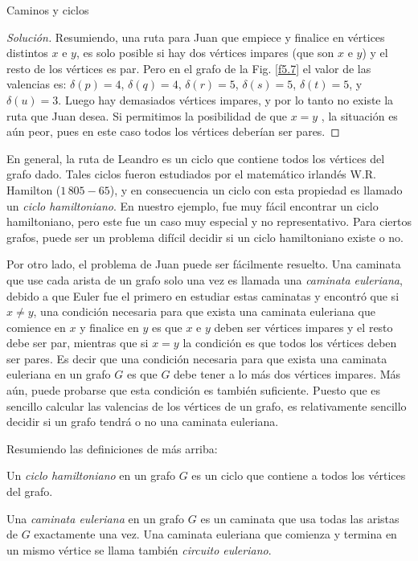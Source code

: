 \begin{section}{Caminos y ciclos}
\begin{ejemplo}
\begin{proof}[Solución]
	Resumiendo, una ruta para Juan que empiece y finalice en vértices distintos $x$ e $y$, es solo posible si hay dos vértices impares (que son $x$ e $y$) y el resto de los vértices es par.  Pero en el grafo de la Fig. \ref{f5.7} el valor de las valencias es: $\delta(p)=4$, $\delta(q)=4$, $\delta(r)=5$, $\delta(s)=5$,
	$\delta(t)=5$, y $\delta(u)=3$. Luego hay demasiados vértices impares, y por lo tanto no existe la ruta que Juan desea. Si permitimos la posibilidad de que $x=y$ , la situación es aún peor, pues en este caso todos los vértices deberían ser pares.
\end{proof}
\end{ejemplo}



En general, la ruta de Leandro es un ciclo que contiene todos
los vértices del grafo dado. Tales ciclos fueron estudiados por el
matemático irlandés W.R. Hamilton ($1\,805-65$),   y en consecuencia un ciclo con esta propiedad es llamado un
{\em ciclo hamiltoniano}. En nuestro ejemplo, fue muy fácil
 encontrar un ciclo hamiltoniano, pero
este fue un caso muy especial y no representativo. Para ciertos
grafos, puede ser un problema difícil decidir si un ciclo
hamiltoniano existe o no.

Por otro lado, el problema de Juan puede ser fácilmente
resuelto. Una caminata que use cada arista de un grafo solo una
vez es llamada una {\em caminata euleriana}, debido a que Euler
 fue el primero en estudiar estas
caminatas y encontró que si $x\not= y$, una condición necesaria
para que exista una caminata euleriana que comience en $x$ y
finalice en $y$ es que $x$ e $y$ deben ser vértices impares y el
resto debe ser par, mientras que si $x=y$ la condición es que
todos los vértices deben ser pares. Es decir que una condición
necesaria para que exista una caminata euleriana en un grafo $G$
es que $G$ debe tener a lo más dos vértices impares. Más aún,
puede probarse que esta condición es también suficiente. Puesto
que es sencillo calcular las valencias de los vértices de un
grafo, es relativamente sencillo decidir si un grafo tendrá o no
una caminata euleriana. 

Resumiendo las definiciones de más arriba:


\begin{definicion}
Un {\em ciclo hamiltoniano} en un grafo $G$ es un ciclo que contiene a todos los vértices del grafo.

Una {\em caminata euleriana} en un grafo $G$ es un caminata que usa todas las aristas de $G$ exactamente
una vez. Una caminata euleriana que comienza y termina en un mismo vértice se llama también {\em circuito euleriano}.
\end{definicion}


\end{section}
